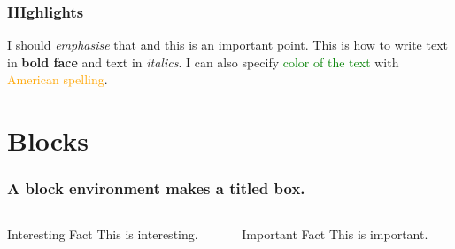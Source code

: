 \documentclass{beamer}
\begin{document}
\begin{frame}
    \frametitle{HIghlights}
    I should \emph{emphasise} that and this is an \alert{important} point. This is how to write text in \textbf{bold face} and text in \textit{italics}. I can also specify \textcolor{green}{color of the text} with \textcolor{orange}{American spelling}.
\end{frame}

\section{Blocks}


\begin{frame}
    \frametitle{A block environment makes a titled box.}
    \begin{columns}
        \begin{column}{0.45\textwidth}
            \begin{block}{Interesting Fact}
                This is interesting.
            \end{block}
        \end{column}
        \pause
        \begin{column}{0.45\textwidth}
            \begin{alertblock}{Important Fact}
                This is important.
            \end{alertblock}
        \end{column}
    \end{columns}
\end{frame}
\end{document}
